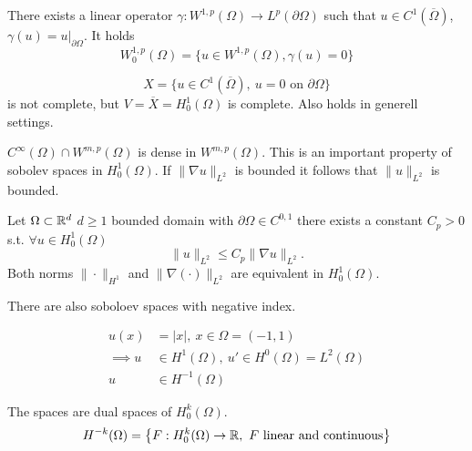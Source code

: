 There exists a linear operator $\gamma: W^{1,p}(\Omega) \to L^p(\partial\Omega)$ such that $u \in C^1(\overline{\Omega})$, $\gamma(u) = u|_{\partial \Omega}$. It holds 
\begin{equation*}
	W^{1,p}_0(\Omega) = \big \{ u \in W^{1,p}(\Omega), \gamma(u) = 0 \big \}
\end{equation*}

\begin{example}
	\begin{equation*}
	X= \big \{ u \in C^1(\overline{\Omega}), \ u=0 \text{ on } \partial\Omega  \big \}
	\end{equation*}
	is not complete, but $V = \overline{X} = H^1_0(\Omega)$ is complete. Also holds in  generell settings.\\
\end{example}

\par
 $C^\infty(\Omega)\cap W^{m,p}(\Omega)$ is dense in $ W^{m,p}(\Omega)$.
This is an important property of sobolev spaces in $H^1_0(\Omega)$. \enter
If $\|\nabla u \|_{L^2}$ is bounded it follows that $\|u \|_{L^2}$ is bounded.

\begin{theorem}
	Let $\Omega \subset \mathbb{R}^d$ $d\geq 1$ bounded domain with $\partial \Omega \in C^{0,1}$ there exists a constant $C_p > 0$ s.t. $\forall u\in H^1_0(\Omega)$
	\begin{equation*}
		\|u\|_{L^2} \leq C_p \|\nabla u\|_{L^2}.
	\end{equation*}
	Both norms $\|\cdot\|_{H^1}$ and $ \|\nabla(\cdot)\|_{L^2} $ are equivalent in $H^1_0(\Omega)$.
\end{theorem}
 
There are also soboloev spaces with negative index.\enter

\begin{example}
	\begin{align*}
	u(x) &= |x|, \ x\in \Omega = (-1,1)\\
	\implies u&\in H^1(\Omega),\ u' \in H^0(\Omega) = L^2(\Omega)\\
	u &\in H^{-1}(\Omega)
	\end{align*}
\end{example}


The spaces are dual spaces of $H^k_0(\Omega)$.
\begin{equation*}
	H^{-k}(\Omega) = \big \{ F: H^k_0(\Omega) \to \mathbb{R},\  F \text{ linear and continuous} \big \}
\end{equation*}


